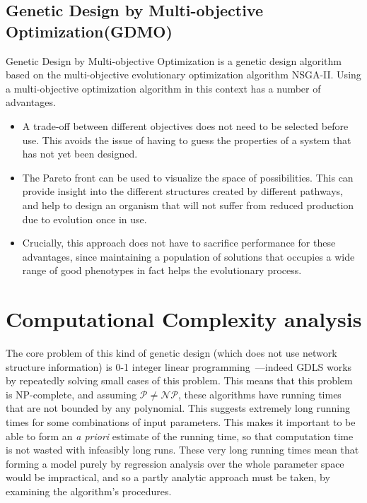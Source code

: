 \subsection{Genetic Design by Multi-objective Optimization(GDMO)} 
Genetic Design by Multi-objective Optimization  is a genetic design algorithm based on the multi-objective evolutionary optimization algorithm NSGA-II.
Using a multi-objective optimization algorithm in this context has a number of advantages.
\begin{itemize}
\item A trade-off between different objectives does not need to be selected before use. This avoids the issue of having to guess the properties of a system that has not yet been designed.
\item The Pareto front can be used to visualize the space of possibilities. This can provide insight into the different structures created by different pathways, and help to design an organism that will not suffer from reduced production due to evolution once in use.
\item Crucially, this approach  does not have to sacrifice performance for these advantages, since maintaining a population of solutions that occupies a wide range of good phenotypes in fact helps the evolutionary process.
\end{itemize}

\section{Computational Complexity analysis}
The core problem of this kind of genetic design (which does not use network structure information) is 0-1 integer linear programming~\cite{Karp1972}---indeed GDLS works by repeatedly solving small cases of this problem.
This means that this problem is NP-complete, and assuming \(\mathcal{P} \neq \mathcal{NP}\), these algorithms have running times that are not bounded by any polynomial.
This suggests extremely long running times for some combinations of input parameters.
This makes it important to be able to form an \emph{a priori} estimate of the running time, so that computation time is not wasted with infeasibly long runs.
These very long running times mean that forming a model purely by regression analysis over the whole parameter space would be impractical, and so a partly analytic approach must be taken, by examining the algorithm's procedures.

